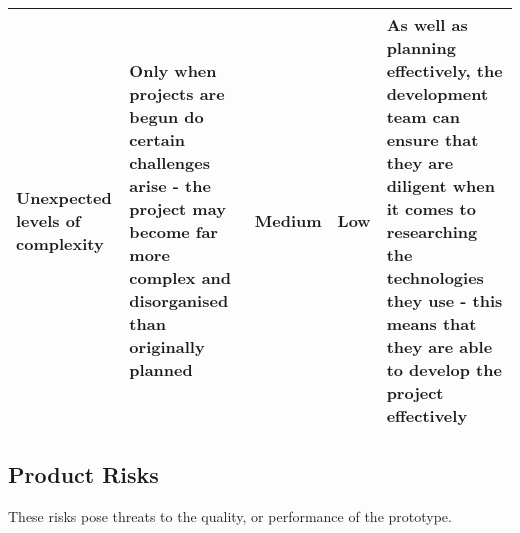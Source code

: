 \begin{tabularx}{\textwidth}{szssz}
    Unexpected levels of complexity & Only when projects are begun do certain challenges arise - the project may become far more complex and disorganised than originally planned & Medium & Low & As well as planning effectively, the development team can ensure that they are diligent when it comes to researching the technologies they use - this means that they are able to develop the project effectively \\\hline

\end{tabularx}

\subsection{Product Risks}\label{subsec:product-risks}

These risks pose threats to the quality, or performance of the prototype.

